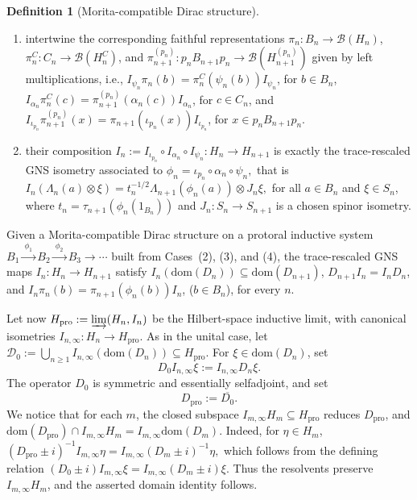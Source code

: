 \documentclass[11pt]{amsart}
\theoremstyle{definition}
\newtheorem{definition}[theorem]{Definition}
\theoremstyle{remark}
\newcommand{\ex}{\mathrm{pro}}
\newcommand{\dom}{\mathrm{dom}}
\begin{document}
\begin{definition}[Morita-compatible Dirac structure]
\begin{enumerate}
\item[($iv_b$)] intertwine the corresponding faithful representations $\pi_n\colon B_n\to\mathcal B(H_n)$, 
$\pi_n^C\colon C_n\to\mathcal B(H_n^C)$, and
$\pi_{n+1}^{(p_n)}\colon p_nB_{n+1}p_n
   \to\mathcal B(H_{n+1}^{(p_n)})$ given by left multiplications, i.e.,
$I_{\psi_n}\pi_n(b)
=
\pi_n^C(\psi_n(b))I_{\psi_n}$, for $b\in B_n$, $I_{\alpha_n}\pi_n^C(c)
=
\pi_{n+1}^{(p_n)}(\alpha_n(c))I_{\alpha_n}$,
for $c\in C_n$,
and $I_{\iota_{p_n}}\pi_{n+1}^{(p_n)}(x)
=
\pi_{n+1}(\iota_{p_n}(x))I_{\iota_{p_n}}$, for
$x\in p_nB_{n+1}p_n$.

\item[($iv_c$)] their composition $I_n
:=
I_{\iota_{p_n}}\circ I_{\alpha_n}\circ I_{\psi_n}
:
H_n\to H_{n+1}$
is exactly the trace-rescaled GNS isometry associated to $\phi_n=\iota_{p_n}\circ\alpha_n\circ\psi_n,$ that is
$I_n(\Lambda_n(a)\otimes\xi)
=
t_n^{-1/2}\Lambda_{n+1}(\phi_n(a))\otimes J_n\xi,$ for all $a\in B_n$ and $\xi\in S_n$, where $t_n=\tau_{n+1}(\phi_n(1_{B_n}))$ and $
J_n\colon S_n\to S_{n+1}$
is a chosen spinor isometry.
\end{enumerate} 

\end{definition}

Given a Morita-compatible Dirac structure on a protoral inductive system $B_1\xrightarrow{\ \phi_1\ }B_2\xrightarrow{\ \phi_2\ }B_3\xrightarrow{}\cdots$ built from Cases~\textup{(2)}, \textup{(3)}, and
\textup{(4)}, the trace-rescaled GNS maps $I_n\colon H_n\to H_{n+1}$
satisfy $I_n(\dom (D_n))\subseteq \dom (D_{n+1})$,
$D_{n+1}I_n=I_nD_n$, and $I_n\pi_n(b)=\pi_{n+1}(\phi_n(b))I_n$, ($b\in B_n$), for every $n$. 

Let now $H_{\ex}:=\varinjlim(H_n,I_n)$ be the Hilbert-space inductive limit, with canonical isometries $I_{n,\infty}:H_n\to H_\ex$. As in the unital case, let $\mathcal D_0:=\bigcup_{n\geq1}I_{n,\infty}(\dom (D_n))\subseteq H_\ex.$
For $\xi\in\dom (D_n)$, set \[D_0I_{n,\infty}\xi:=I_{n,\infty}D_n\xi.\]
The operator $D_0$ is symmetric and essentially selfadjoint, and set
\[
D_\ex:=\overline{D_0}.
\]
We notice that  for each $m$, the closed subspace
$I_{m,\infty}H_m\subseteq H_{\ex}$ reduces $D_{\ex}$, and $\dom(D_{\ex})\cap I_{m,\infty}H_m=I_{m,\infty}\dom(D_m).$
Indeed, for $\eta\in H_m$,
$(D_{\ex}\pm i)^{-1}I_{m,\infty}\eta=I_{m,\infty}(D_m\pm i)^{-1}\eta,$
which follows from the defining relation $(D_0\pm i)I_{m,\infty}\xi=I_{m,\infty}(D_m\pm i)\xi.$
Thus the resolvents preserve $I_{m,\infty}H_m$, and the asserted domain
identity follows.
\end{document}
